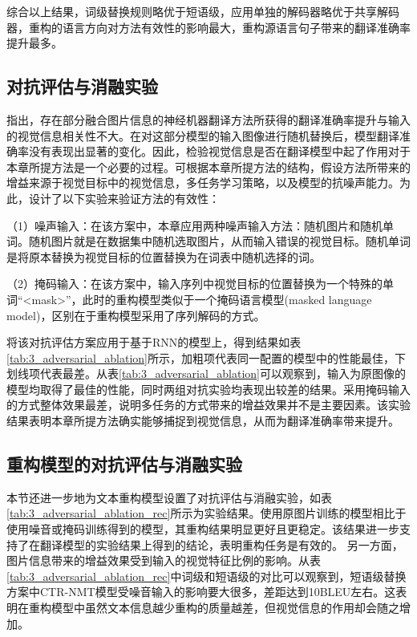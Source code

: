 综合以上结果，词级替换规则略优于短语级，应用单独的解码器略优于共享解码器，重构的语言方向对方法有效性的影响最大，重构源语言句子带来的翻译准确率提升最多。

\subsection{对抗评估与消融实验}
\label{sec:3_adversarial_ablation}


指出，存在部分融合图片信息的神经机器翻译方法所获得的翻译准确率提升与输入的视觉信息相关性不大。在对这部分模型的输入图像进行随机替换后，模型翻译准确率没有表现出显著的变化。因此，检验视觉信息是否在翻译模型中起了作用对于本章所提方法是一个必要的过程。可根据本章所提方法的结构，假设方法所带来的增益来源于视觉目标中的视觉信息，多任务学习策略，以及模型的抗噪声能力。为此，设计了以下实验来验证方法的有效性：

（1）{\sffamily 噪声输入：}在该方案中，本章应用两种噪声输入方法：随机图片和随机单词。随机图片就是在数据集中随机选取图片，从而输入错误的视觉目标。随机单词是将原本替换为视觉目标的位置替换为在词表中随机选择的词。

（2）{\sffamily 掩码输入：}在该方案中，输入序列中视觉目标的位置替换为一个特殊的单词“<mask>”，此时的重构模型类似于一个掩码语言模型(masked language model)，区别在于重构模型采用了序列解码的方式。

将该对抗评估方案应用于基于RNN的模型上，得到结果如表\ref{tab:3_adversarial_ablation}所示，加粗项代表同一配置的模型中的性能最佳，下划线项代表最差。从表\ref{tab:3_adversarial_ablation}可以观察到，输入为原图像的模型均取得了最佳的性能，同时两组对抗实验均表现出较差的结果。采用掩码输入的方式整体效果最差，说明多任务的方式带来的增益效果并不是主要因素。该实验结果表明本章所提方法确实能够捕捉到视觉信息，从而为翻译准确率带来提升。

\subsection{重构模型的对抗评估与消融实验}
\label{sec:3_adversarial_ablation_rec}


本节还进一步地为文本重构模型设置了对抗评估与消融实验，如表\ref{tab:3_adversarial_ablation_rec}所示为实验结果。使用原图片训练的模型相比于使用噪音或掩码训练得到的模型，其重构结果明显更好且更稳定。该结果进一步支持了在翻译模型的实验结果上得到的结论，表明重构任务是有效的。 另一方面，图片信息带来的增益效果受到输入的视觉特征比例的影响。从表\ref{tab:3_adversarial_ablation_rec}中词级和短语级的对比可以观察到，短语级替换方案中CTR-NMT模型受噪音输入的影响要大很多，差距达到10BLEU左右。这表明在重构模型中虽然文本信息越少重构的质量越差，但视觉信息的作用却会随之增加。

